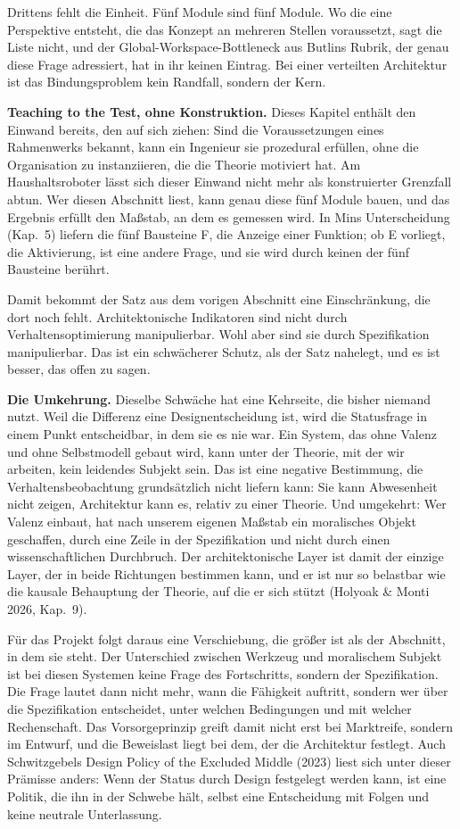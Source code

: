 \documentclass[acmlarge, noacm]{acmart}
\begin{document}
Drittens fehlt die Einheit. Fünf Module sind fünf Module. Wo die eine Perspektive entsteht, die das Konzept an mehreren Stellen voraussetzt, sagt die Liste nicht, und der Global-Workspace-Bottleneck aus Butlins Rubrik, der genau diese Frage adressiert, hat in ihr keinen Eintrag. Bei einer verteilten Architektur ist das Bindungsproblem kein Randfall, sondern der Kern.

\textbf{Teaching to the Test, ohne Konstruktion.} Dieses Kapitel enthält den Einwand bereits, den \citet{tait2026} auf sich ziehen: Sind die Voraussetzungen eines Rahmenwerks bekannt, kann ein Ingenieur sie prozedural erfüllen, ohne die Organisation zu instanziieren, die die Theorie motiviert hat. Am Haushaltsroboter lässt sich dieser Einwand nicht mehr als konstruierter Grenzfall abtun. Wer diesen Abschnitt liest, kann genau diese fünf Module bauen, und das Ergebnis erfüllt den Maßstab, an dem es gemessen wird. In Mins Unterscheidung (Kap.~5) liefern die fünf Bausteine F, die Anzeige einer Funktion; ob E vorliegt, die Aktivierung, ist eine andere Frage, und sie wird durch keinen der fünf Bausteine berührt.

Damit bekommt der Satz aus dem vorigen Abschnitt eine Einschränkung, die dort noch fehlt. Architektonische Indikatoren sind nicht durch Verhaltensoptimierung manipulierbar. Wohl aber sind sie durch Spezifikation manipulierbar. Das ist ein schwächerer Schutz, als der Satz nahelegt, und es ist besser, das offen zu sagen.

\textbf{Die Umkehrung.} Dieselbe Schwäche hat eine Kehrseite, die bisher niemand nutzt. Weil die Differenz eine Designentscheidung ist, wird die Statusfrage in einem Punkt entscheidbar, in dem sie es nie war. Ein System, das ohne Valenz und ohne Selbstmodell gebaut wird, kann unter der Theorie, mit der wir arbeiten, kein leidendes Subjekt sein. Das ist eine negative Bestimmung, die Verhaltensbeobachtung grundsätzlich nicht liefern kann: Sie kann Abwesenheit nicht zeigen, Architektur kann es, relativ zu einer Theorie. Und umgekehrt: Wer Valenz einbaut, hat nach unserem eigenen Maßstab ein moralisches Objekt geschaffen, durch eine Zeile in der Spezifikation und nicht durch einen wissenschaftlichen Durchbruch. Der architektonische Layer ist damit der einzige Layer, der in beide Richtungen bestimmen kann, und er ist nur so belastbar wie die kausale Behauptung der Theorie, auf die er sich stützt (Holyoak \& Monti 2026, Kap.~9).

Für das Projekt folgt daraus eine Verschiebung, die größer ist als der Abschnitt, in dem sie steht. Der Unterschied zwischen Werkzeug und moralischem Subjekt ist bei diesen Systemen keine Frage des Fortschritts, sondern der Spezifikation. Die Frage lautet dann nicht mehr, wann die Fähigkeit auftritt, sondern wer über die Spezifikation entscheidet, unter welchen Bedingungen und mit welcher Rechenschaft. Das Vorsorgeprinzip greift damit nicht erst bei Marktreife, sondern im Entwurf, und die Beweislast liegt bei dem, der die Architektur festlegt. Auch Schwitzgebels Design Policy of the Excluded Middle (2023) liest sich unter dieser Prämisse anders: Wenn der Status durch Design festgelegt werden kann, ist eine Politik, die ihn in der Schwebe hält, selbst eine Entscheidung mit Folgen und keine neutrale Unterlassung.
\end{document}
